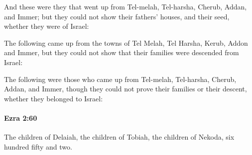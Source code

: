 			\begin{versebox}
					\item[BHS] 
					\item[LXX] 
					\item[ASV] And these were they that went up from Tel-melah, Tel-harsha, Cherub, Addan, and Immer; but they could not show their fathers' houses, and their seed, whether they were of Israel:
					\item[NIV] The following came up from the towns of Tel Melah, Tel Harsha, Kerub, Addon and Immer, but they could not show that their families were descended from Israel:
					\item[NRSV] The following were those who came up from Tel-melah, Tel-harsha, Cherub, Addan, and Immer, though they could not prove their families or their descent, whether they belonged to Israel:
			\end{versebox}

		\paragraph{Ezra 2:60} %
			\label{EZRA-2-60}

			The children of Delaiah, the children of Tobiah, the children of Nekoda, six hundred fifty and two.

